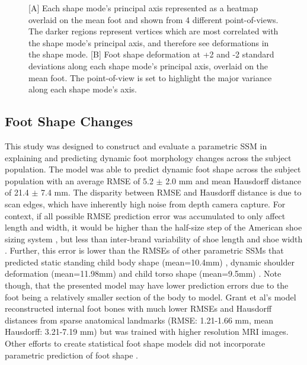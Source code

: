 \documentclass[defaultstyle,11pt]{comps}
\begin{document}
\begin{figure}
\centering


\caption{{[}A{]} Each shape mode's principal axis represented as a heatmap overlaid on the mean foot and shown from 4 different point-of-views. The darker regions represent vertices which are most correlated with the shape mode's principal axis, and therefore see deformations in the shape mode. {[}B{]} Foot shape deformation at +2 and -2 standard deviations along each shape mode's principal axis, overlaid on the mean foot. The point-of-view is set to highlight the major variance along each shape mode's axis.}

\label{fig:pca_all}

\end{figure}

\hypertarget{foot-shape-changes}{%
\subsection{Foot Shape Changes}\label{foot-shape-changes}}

This study was designed to construct and evaluate a parametric SSM in explaining and predicting dynamic foot morphology changes across the subject population.
The model was able to predict dynamic foot shape across the subject population with an average RMSE of 5.2 \(\pm\) 2.0 mm and mean Hausdorff distance of 21.4 \(\pm\) 7.4 mm.
The disparity between RMSE and Hausdorff distance is due to scan edges, which have inherently high noise from depth camera capture.
For context, if all possible RMSE prediction error was accumulated to only affect length and width, it would be higher than the half-size step of the American shoe sizing system \citep{Luximon2013}, but less than inter-brand variability of shoe length and shoe width \citep{Wannop2019}.
Further, this error is lower than the RMSEs of other parametric SSMs that predicted static standing child body shape (mean=10.4mm) \citep{Park2015a}, dynamic shoulder deformation (mean=11.98mm) \citep{Kim2016} and child torso shape (mean=9.5mm) \citep{Park2017}.
Note though, that the presented model may have lower prediction errors due to the foot being a relatively smaller section of the body to model.
Grant et al's model reconstructed internal foot bones with much lower RMSEs and Hausdorff distances from sparse anatomical landmarks (RMSE: 1.21-1.66 mm, mean Hausdorff: 3.21-7.19 mm) \citep{Grant2020} but was trained with higher resolution MRI images.
Other efforts to create statistical foot shape models did not incorporate parametric prediction of foot shape \citep{Conrad2019, Stankovic2020}.
\end{document}

